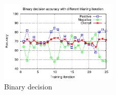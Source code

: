 \begin{itemize}



\begin{figure}[H]
\begin{center}
\includegraphics[width = 0.5\textwidth]{pic/model_2b.pdf}
\caption{Binary decision }
\end{center}
\end{figure}


\end{itemize}
